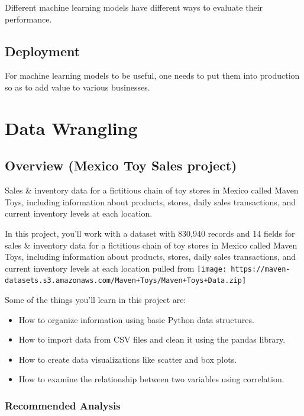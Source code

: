\documentclass[
]{book}
\begin{document}
Different machine learning models have different ways to evaluate their performance.

\hypertarget{deployment}{%
\section{Deployment}\label{deployment}}

For machine learning models to be useful, one needs to put them into production so as to add value to various businesses.

\hypertarget{tidy}{%
\chapter{Data Wrangling}\label{tidy}}

\hypertarget{overview-mexico-toy-sales-project}{%
\section{Overview (Mexico Toy Sales project)}\label{overview-mexico-toy-sales-project}}

Sales \& inventory data for a fictitious chain of toy stores in Mexico called Maven Toys, including information about products, stores, daily sales transactions, and current inventory levels at each location.

In this project, you'll work with a dataset with 830,940 records and 14 fields for sales \& inventory data for a fictitious chain of toy stores in Mexico called Maven Toys, including information about products, stores, daily sales transactions, and current inventory levels at each location pulled from \texttt{[image: https://maven-datasets.s3.amazonaws.com/Maven+Toys/Maven+Toys+Data.zip]}

Some of the things you'll learn in this project are:

\begin{itemize}
\item
  How to organize information using basic Python data structures.
\item
  How to import data from CSV files and clean it using the pandas library.
\item
  How to create data visualizations like scatter and box plots.
\item
  How to examine the relationship between two variables using correlation.
\end{itemize}

\hypertarget{recommended-analysis}{%
\subsection{Recommended Analysis}\label{recommended-analysis}}
\end{document}
